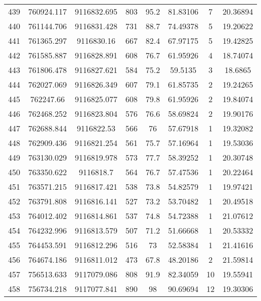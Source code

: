 \begin{longtable}{cccccccc}
439  & 760924.117      & 9116832.695      & 803     & 95.2  & 81.83106 & 7  & 20.36894 \\
440  & 761144.706      & 9116831.428      & 731     & 88.7  & 74.49378 & 5  & 19.20622 \\
441  & 761365.297      & 9116830.16       & 667     & 82.4  & 67.97175 & 5  & 19.42825 \\
442  & 761585.887      & 9116828.891      & 608     & 76.7  & 61.95926 & 4  & 18.74074 \\
443  & 761806.478      & 9116827.621      & 584     & 75.2  & 59.5135  & 3  & 18.6865  \\
444  & 762027.069      & 9116826.349      & 607     & 79.1  & 61.85735 & 2  & 19.24265 \\
445  & 762247.66       & 9116825.077      & 608     & 79.8  & 61.95926 & 2  & 19.84074 \\
446  & 762468.252      & 9116823.804      & 576     & 76.6  & 58.69824 & 2  & 19.90176 \\
447  & 762688.844      & 9116822.53       & 566     & 76    & 57.67918 & 1  & 19.32082 \\
448  & 762909.436      & 9116821.254      & 561     & 75.7  & 57.16964 & 1  & 19.53036 \\
449  & 763130.029      & 9116819.978      & 573     & 77.7  & 58.39252 & 1  & 20.30748 \\
450  & 763350.622      & 9116818.7        & 564     & 76.7  & 57.47536 & 1  & 20.22464 \\
451  & 763571.215      & 9116817.421      & 538     & 73.8  & 54.82579 & 1  & 19.97421 \\
452  & 763791.808      & 9116816.141      & 527     & 73.2  & 53.70482 & 1  & 20.49518 \\
453  & 764012.402      & 9116814.861      & 537     & 74.8  & 54.72388 & 1  & 21.07612 \\
454  & 764232.996      & 9116813.579      & 507     & 71.2  & 51.66668 & 1  & 20.53332 \\
455  & 764453.591      & 9116812.296      & 516     & 73    & 52.58384 & 1  & 21.41616 \\
456  & 764674.186      & 9116811.012      & 473     & 67.8  & 48.20186 & 2  & 21.59814 \\
457  & 756513.633      & 9117079.086      & 808     & 91.9  & 82.34059 & 10 & 19.55941 \\
458  & 756734.218      & 9117077.841      & 890     & 98    & 90.69694 & 12 & 19.30306 \\

\end{longtable}

